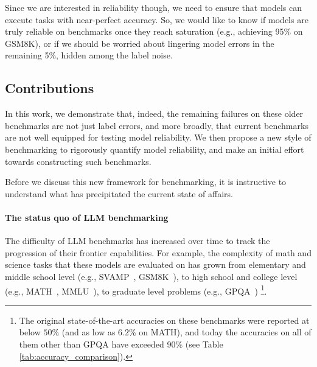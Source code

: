 Since we are interested in reliability though,
we need to ensure that models can execute tasks with near-perfect accuracy.
So, we would like to know if models are truly reliable on benchmarks once they reach saturation (e.g., achieving 95\% on GSM8K), or if we should be worried about lingering model errors in the remaining 5\%, hidden among the label noise. 














\subsection{Contributions}
In this work, we demonstrate that, indeed, the remaining failures on these older benchmarks are not just label errors, and more broadly, that current benchmarks are not well equipped for testing model reliability. 
We then propose a new style of benchmarking to rigorously quantify model reliability, and make an initial effort towards constructing such benchmarks.

Before we discuss this new framework for benchmarking, it is instructive to understand what has precipitated the current state of affairs.

\vspace{-4pt}
\paragraph{The status quo of LLM benchmarking} %


The difficulty of LLM benchmarks has increased over time to track the progression of their frontier capabilities. For example, the complexity of math and science tasks that these models are evaluated on has grown from elementary and middle school level (e.g., SVAMP~\citep{patel2021nlp}, GSM8K~\citep{cobbe2021training}), to high school and college level (e.g., MATH~\citep{hendrycksmath2021}, MMLU~\cite{hendrycks2020measuring}), to graduate level problems (e.g., GPQA~\cite{rein2023gpqa})
\footnote{The original state-of-the-art accuracies on these benchmarks were reported at below $50\%$ (and as low as $6.2\%$ on MATH), and today the accuracies on all of them other than GPQA have exceeded 90\% (see Table \ref{tab:accuracy_comparison}).}.







